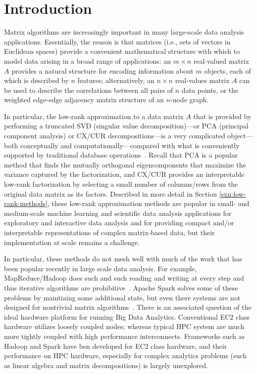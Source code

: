\section{Introduction}
\label{sec:intro}

Matrix algorithms are increasingly important in many large-scale data analysis applications.
Essentially, the reason is that matrices (i.e., sets of vectors in Euclidean spaces) provide a convenient mathematical structure with which to model data arising in a broad range of applications: an $m \times n$ real-valued matrix $A$ provides a natural structure for
encoding information about $m$ objects, each of which is described by $n$
features; alternatively, an $n \times n$ real-values matrix $A$ can be used to describe
the correlations between all pairs of $n$ data points, or the weighted
edge-edge adjacency matrix structure of an $n$-node graph.%

In particular, the low-rank approximation to a data matrix $A$ that is provided by performing a truncated SVD (singular value decomposition)---or PCA (principal component analysis) or CX/CUR decompositions---is a very complicated object---both conceptually and computationally---compared with what is conveniently supported by traditional database operations~\cite{Skillicorn07}. Recall that PCA is a popular method that finds the mutually orthogonal eigencomponents that maximize the variance captured by the factorization, and CX/CUR provides an interpretable low-rank factorization by selecting a small number of columns/rows from the original data matrix as its factors.
Described in more detail in Section \ref{sxn:low-rank-methods}, these low-rank approximation methods are popular in small- and medium-scale machine learning and scientific data analysis applications for exploratory and interactive data analysis and for providing compact and/or interpretable representations of complex matrix-based data, but their implementation at scale remains a challenge.

In particular, these methods do not mesh well with much of the work that has been popular recently in large scale data analysis.
For example, MapReduce/Hadoop does such and such reading and writing at every step and thus iterative algorithms are prohibitive~\cite{DG08_CACM}.
Apache Spark solves some of these problems by maintiaing some additional state, but even there systems are not designed for nontrivial matrix algorithms~\cite{SPARK_NSDI_12}. There is an associated question of the ideal hardware platform for running Big Data Analytics. Conventional EC2 class hardware utilizes loosely coupled nodes; whereas typical HPC system are much more tightly coupled with high performance interconnects. Frameworks such as Hadoop and Spark have ben developed for EC2 class hardware, and their performance on HPC hardware, especially for complex analytics problems (such as linear algebra and matrix decompositions) is largely unexplored. 

